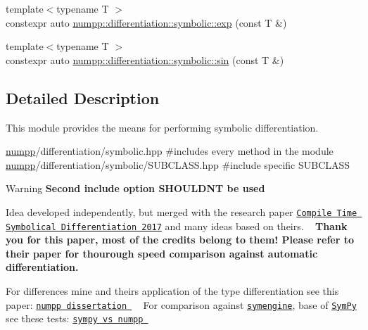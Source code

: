 \begin{DoxyCompactItemize}
\item 
{\footnotesize template$<$typename T $>$ }\\constexpr auto \hyperlink{group__numpp__differentiation__symbolic_ga4bcf2dcdbc549b58c9fb7cd1b8c1cf70}{numpp\+::differentiation\+::symbolic\+::exp} (const T \&)
\end{DoxyCompactItemize}
\begin{DoxyCompactItemize}
\item 
{\footnotesize template$<$typename T $>$ }\\constexpr auto \hyperlink{group__numpp__differentiation__symbolic_ga49ba3eed5ff463e79a88f4952f73f435}{numpp\+::differentiation\+::symbolic\+::sin} (const T \&)
\end{DoxyCompactItemize}


\subsection{Detailed Description}
This module provides the means for performing symbolic differentiation. 


\begin{DoxyCode}
\hyperlink{namespacenumpp}{numpp}/differentiation/symbolic.hpp #includes every method in the module
\hyperlink{namespacenumpp}{numpp}/differentiation/symbolic/SUBCLASS.hpp #include specific SUBCLASS
\end{DoxyCode}


\begin{DoxyWarning}{Warning}
{\bfseries Second include option S\+H\+O\+U\+L\+DN\textquotesingle{}T be used}
\end{DoxyWarning}
Idea developed independently, but merged with the research paper \href{https://arxiv.org/abs/1705.01729}{\tt Compile Time Symbolical Differentiation 2017} and many ideas based on theirs. ~\newline
{\bfseries Thank you for this paper, most of the credits belong to them! Please refer to their paper for thourough speed comparison against automatic differentiation.}

For differences mine and theirs application of the type differentiation see this paper\+: \href{https://github.com}{\tt numpp dissertation } ~\newline
 For comparison against \href{https://github.com/symengine/symengine}{\tt symengine}, base of \href{http://www.sympy.org/en/index.html}{\tt Sym\+Py} see these tests\+: \href{https://github.com}{\tt sympy vs numpp }

